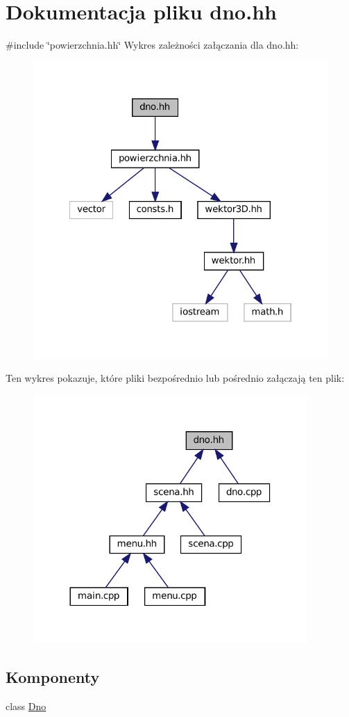 \hypertarget{dno_8hh}{}\section{Dokumentacja pliku dno.\+hh}
\label{dno_8hh}
{\ttfamily \#include \char`\"{}powierzchnia.\+hh\char`\"{}}\newline
Wykres zależności załączania dla dno.\+hh\+:\nopagebreak
\begin{figure}[H]
\begin{center}
\leavevmode
\includegraphics[width=322pt]{dno_8hh__incl}
\end{center}
\end{figure}
Ten wykres pokazuje, które pliki bezpośrednio lub pośrednio załączają ten plik\+:\nopagebreak
\begin{figure}[H]
\begin{center}
\leavevmode
\includegraphics[width=296pt]{dno_8hh__dep__incl}
\end{center}
\end{figure}
\subsection*{Komponenty}
\begin{DoxyCompactItemize}
\item 
class \mbox{\hyperlink{class_dno}{Dno}}
\end{DoxyCompactItemize}
